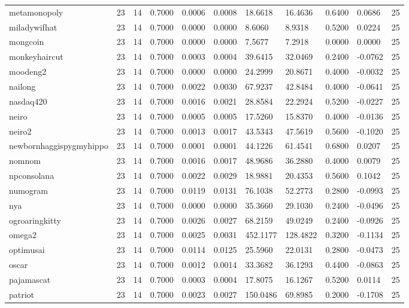 \begin{table}[htbp]
\begin{tabular}{lllllllllll}
metamonopoly & 23 & 14 & 0.7000 & 0.0006 & 0.0008 & 18.6618 & 16.4636 & 0.6400 & 0.0686 & 25 \\
miladywifhat & 23 & 14 & 0.7000 & 0.0000 & 0.0000 & 8.6060 & 8.9318 & 0.5200 & 0.0224 & 25 \\
mongcoin & 23 & 14 & 0.7000 & 0.0000 & 0.0000 & 7.5677 & 7.2918 & 0.0000 & 0.0000 & 25 \\
monkeyhaircut & 23 & 14 & 0.7000 & 0.0003 & 0.0004 & 39.6415 & 32.0469 & 0.2400 & -0.0762 & 25 \\
moodeng2 & 23 & 14 & 0.7000 & 0.0000 & 0.0000 & 24.2999 & 20.8671 & 0.4000 & -0.0032 & 25 \\
nailong & 23 & 14 & 0.7000 & 0.0022 & 0.0030 & 67.9237 & 42.8484 & 0.4000 & -0.0641 & 25 \\
nasdaq420 & 23 & 14 & 0.7000 & 0.0016 & 0.0021 & 28.8584 & 22.2924 & 0.5200 & -0.0227 & 25 \\
neiro & 23 & 14 & 0.7000 & 0.0005 & 0.0005 & 17.5260 & 15.8370 & 0.4000 & -0.0136 & 25 \\
neiro2 & 23 & 14 & 0.7000 & 0.0013 & 0.0017 & 43.5343 & 47.5619 & 0.5600 & -0.1020 & 25 \\
newbornhaggispygmyhippo & 23 & 14 & 0.7000 & 0.0001 & 0.0001 & 44.1226 & 61.4541 & 0.6800 & 0.0207 & 25 \\
nomnom & 23 & 14 & 0.7000 & 0.0016 & 0.0017 & 48.9686 & 36.2880 & 0.4000 & 0.0079 & 25 \\
npconsolana & 23 & 14 & 0.7000 & 0.0022 & 0.0029 & 18.9881 & 20.4353 & 0.5600 & 0.1042 & 25 \\
numogram & 23 & 14 & 0.7000 & 0.0119 & 0.0131 & 76.1038 & 52.2773 & 0.2800 & -0.0993 & 25 \\
nya & 23 & 14 & 0.7000 & 0.0000 & 0.0000 & 35.3660 & 29.1030 & 0.2400 & -0.0496 & 25 \\
ogroaringkitty & 23 & 14 & 0.7000 & 0.0026 & 0.0027 & 68.2159 & 49.0249 & 0.2400 & -0.0926 & 25 \\
omega2 & 23 & 14 & 0.7000 & 0.0025 & 0.0031 & 452.1177 & 128.4822 & 0.3200 & -0.1134 & 25 \\
optimusai & 23 & 14 & 0.7000 & 0.0114 & 0.0125 & 25.5960 & 22.0131 & 0.2800 & -0.0473 & 25 \\
oscar & 23 & 14 & 0.7000 & 0.0012 & 0.0014 & 33.3682 & 36.1293 & 0.4400 & -0.0863 & 25 \\
pajamascat & 23 & 14 & 0.7000 & 0.0003 & 0.0004 & 17.8075 & 16.1267 & 0.5200 & 0.0114 & 25 \\
patriot & 23 & 14 & 0.7000 & 0.0023 & 0.0027 & 150.0486 & 69.8985 & 0.2000 & -0.1708 & 25 \\

\end{tabular}
\end{table}
